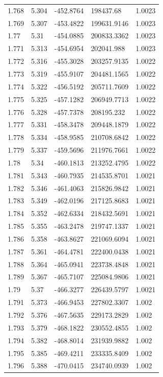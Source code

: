 \begin{tabular}{lllll}
1.768 & 5.304 & -452.8764 & 198437.68 & 1.0023 \\
1.769 & 5.307 & -453.4822 & 199631.9146 & 1.0023 \\
1.77 & 5.31 & -454.0885 & 200833.3362 & 1.0023 \\
1.771 & 5.313 & -454.6954 & 202041.988 & 1.0023 \\
1.772 & 5.316 & -455.3028 & 203257.9135 & 1.0022 \\
1.773 & 5.319 & -455.9107 & 204481.1565 & 1.0022 \\
1.774 & 5.322 & -456.5192 & 205711.7609 & 1.0022 \\
1.775 & 5.325 & -457.1282 & 206949.7713 & 1.0022 \\
1.776 & 5.328 & -457.7378 & 208195.232 & 1.0022 \\
1.777 & 5.331 & -458.3478 & 209448.1879 & 1.0022 \\
1.778 & 5.334 & -458.9585 & 210708.6842 & 1.0022 \\
1.779 & 5.337 & -459.5696 & 211976.7661 & 1.0022 \\
1.78 & 5.34 & -460.1813 & 213252.4795 & 1.0022 \\
1.781 & 5.343 & -460.7935 & 214535.8701 & 1.0021 \\
1.782 & 5.346 & -461.4063 & 215826.9842 & 1.0021 \\
1.783 & 5.349 & -462.0196 & 217125.8683 & 1.0021 \\
1.784 & 5.352 & -462.6334 & 218432.5691 & 1.0021 \\
1.785 & 5.355 & -463.2478 & 219747.1337 & 1.0021 \\
1.786 & 5.358 & -463.8627 & 221069.6094 & 1.0021 \\
1.787 & 5.361 & -464.4781 & 222400.0438 & 1.0021 \\
1.788 & 5.364 & -465.0941 & 223738.4848 & 1.0021 \\
1.789 & 5.367 & -465.7107 & 225084.9806 & 1.0021 \\
1.79 & 5.37 & -466.3277 & 226439.5797 & 1.0021 \\
1.791 & 5.373 & -466.9453 & 227802.3307 & 1.002 \\
1.792 & 5.376 & -467.5635 & 229173.2829 & 1.002 \\
1.793 & 5.379 & -468.1822 & 230552.4855 & 1.002 \\
1.794 & 5.382 & -468.8014 & 231939.9882 & 1.002 \\
1.795 & 5.385 & -469.4211 & 233335.8409 & 1.002 \\
1.796 & 5.388 & -470.0415 & 234740.0939 & 1.002 \\

\end{tabular}
